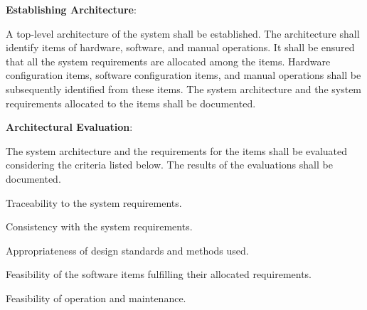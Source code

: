 			\begin{adjustwidth}{2em}{0pt} 

				\begin{compactenum}

					\item {\bf Establishing Architecture}:
					\begin{compactenum}

						\item A top-level architecture of the system shall be established. The architecture shall identify items of hardware, software, and manual operations. It shall be ensured that all the system requirements are allocated among the items. Hardware configuration items, software configuration items, and manual operations shall be subsequently identified from these items. The system architecture and the system requirements allocated to the items shall be documented.

					\end{compactenum}

					\item {\bf Architectural Evaluation}:
					\begin{compactenum}

						\item The system architecture and the requirements for the items shall be evaluated considering the criteria listed below. The results of the evaluations shall be documented.

						\begin{compactenum}

							\item Traceability to the system requirements.

							\item Consistency with the system requirements.

							\item Appropriateness of design standards and methods used.

							\item Feasibility of the software items fulfilling their allocated requirements.

							\item Feasibility of operation and maintenance.

						\end{compactenum}

					\end{compactenum}

				\end{compactenum}

			\end{adjustwidth}

